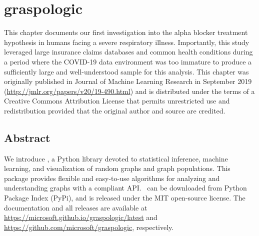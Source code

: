\chapter{graspologic} \label{chap:graspologic}

This chapter documents our first investigation into the alpha blocker treatment hypothesis in humans facing a severe respiratory illness. Importantly, this study leveraged large insurance claims databases and common health conditions during a period where the COVID-19 data environment was too immature to produce a sufficiently large and well-understood sample for this analysis. This chapter was originally published in Journal of Machine Learning Research in September 2019 (\url{http://jmlr.org/papers/v20/19-490.html}) and is distributed under the terms of a Creative Commons Attribution License that permits unrestricted use and redistribution provided that the original author and source are credited.


    

\pagebreak

\section*{Abstract}
We introduce \graspy, a Python library devoted to statistical inference, machine learning, and visualization of random graphs and graph populations. This package  provides flexible and easy-to-use algorithms for analyzing and understanding graphs with a \sklearn compliant API. \graspy ~can be downloaded from Python Package Index (PyPi), and is released under the MIT open-source license. The documentation and all releases are available at \url{https://microsoft.github.io/graspologic/latest} and \url{https://github.com/microsoft/graspologic}, respectively.
\pagebreak


